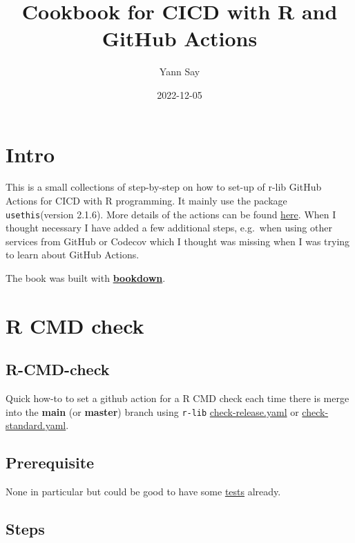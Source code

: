 \documentclass[
]{book}
\title{Cookbook for CICD with R and GitHub Actions}
\author{Yann Say}
\date{2022-12-05}
\begin{document}
\maketitle

{
\setcounter{tocdepth}{1}
\tableofcontents
}
\hypertarget{intro}{%
\chapter{Intro}\label{intro}}

This is a small collections of step-by-step on how to set-up of r-lib GitHub Actions for CICD with R programming. It mainly use the package \texttt{usethis}(version 2.1.6). More details of the actions can be found \href{https://github.com/r-lib/actions/tree/v2-branch/examples}{here}. When I thought necessary I have added a few additional steps, e.g.~when using other services from GitHub or Codecov which I thought was missing when I was trying to learn about GitHub Actions.

The book was built with \href{https://github.com/rstudio/bookdown}{\textbf{bookdown}}.

\hypertarget{r-cmd-check}{%
\chapter{R CMD check}\label{r-cmd-check}}

\hypertarget{r-cmd-check-1}{%
\section{R-CMD-check}\label{r-cmd-check-1}}

Quick how-to to set a github action for a R CMD check each time there is merge into the \textbf{main} (or \textbf{master}) branch using \texttt{r-lib} \href{https://github.com/r-lib/actions/blob/v2-branch/examples/check-release.yaml}{check-release.yaml} or \href{https://github.com/r-lib/actions/blob/v2-branch/examples/check-standard.yaml}{check-standard.yaml}.

\hypertarget{prerequisite}{%
\section{Prerequisite}\label{prerequisite}}

None in particular but could be good to have some \href{https://r-pkgs.org/testing-basics.html}{tests} already.

\hypertarget{steps}{%
\section{Steps}\label{steps}}
\end{document}

